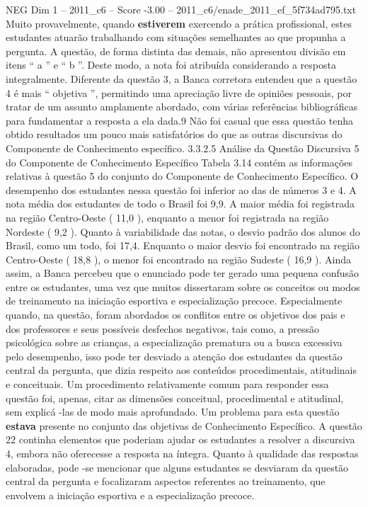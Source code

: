 \begin{textsample}{NEG Dim 1 – 2011\_c6 – Score -3.00 – 2011\_c6/enade\_2011\_ef\_5f734ad795.txt}
Muito provavelmente, quando \textbf{estiverem} exercendo a prática profissional, estes estudantes atuarão trabalhando com situações semelhantes ao que propunha a pergunta.
A questão, de forma distinta das demais, não apresentou divisão em itens “ a ” e “ b ”.
Deste modo, a nota foi atribuída considerando a resposta integralmente.
Diferente da questão 3, a Banca corretora entendeu que a questão 4 é mais “ objetiva ”, permitindo uma apreciação livre de opiniões pessoais, por tratar de um assunto amplamente abordado, com várias referências bibliográficas para fundamentar a resposta a ela dada.9 Não foi casual que essa questão tenha obtido resultados um pouco mais satisfatórios do que as outras discursivas do Componente de Conhecimento específico. 3.3.2.5 Análise da Questão Discursiva 5 do Componente de Conhecimento Específico Tabela 3.14 contém as informações relativas à questão 5 do conjunto do Componente de Conhecimento Específico.
O desempenho dos estudantes nessa questão foi inferior ao das de números 3 e 4.
A nota média dos estudantes de todo o Brasil foi 9,9.
A maior média foi registrada na região Centro-Oeste ( 11,0 ), enquanto a menor foi registrada na região Nordeste ( 9,2 ).
Quanto à variabilidade das notas, o desvio padrão dos alunos do Brasil, como um todo, foi 17,4.
Enquanto o maior desvio foi encontrado na região Centro-Oeste ( 18,8 ), o menor foi encontrado na região Sudeste ( 16,9 ).
Ainda assim, a Banca percebeu que o enunciado pode ter gerado uma pequena confusão entre os estudantes, uma vez que muitos dissertaram sobre os conceitos ou modos de treinamento na iniciação esportiva e especialização precoce.
Especialmente quando, na questão, foram abordados os conflitos entre os objetivos dos pais e dos professores e seus possíveis desfechos negativos, tais como, a pressão psicológica sobre as crianças, a especialização prematura ou a busca excessiva pelo desempenho, isso pode ter desviado a atenção dos estudantes da questão central da pergunta, que dizia respeito aos conteúdos procedimentais, atitudinais e conceituais.
Um procedimento relativamente comum para responder essa questão foi, apenas, citar as dimensões conceitual, procedimental e atitudinal, sem explicá -las de modo mais aprofundado.
Um problema para esta questão \textbf{estava} presente no conjunto das objetivas de Conhecimento Específico.
A questão 22 continha elementos que poderiam ajudar os estudantes a resolver a discursiva 4, embora não oferecesse a resposta na íntegra.
Quanto à qualidade das respostas elaboradas, pode -se mencionar que alguns estudantes se desviaram da questão central da pergunta e focalizaram aspectos referentes ao treinamento, que envolvem a iniciação esportiva e a especialização precoce.

\end{textsample}
